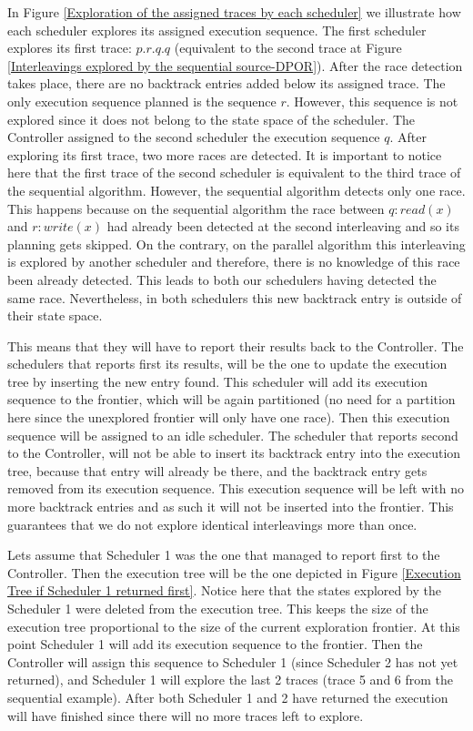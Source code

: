 
In Figure \ref{Exploration of the assigned traces by each scheduler} we illustrate how each scheduler explores its assigned 
execution sequence. The first scheduler explores its first trace: $p.r.q.q$ (equivalent to the second trace 
at Figure \ref{Interleavings explored by the sequential source-DPOR}). After the race detection takes place,
there are no backtrack entries added below its assigned trace. The only execution sequence planned is the sequence $r$. However,
this sequence is not explored since it does not belong to the state space of the scheduler. The Controller assigned to the
second scheduler the execution sequence $q$. After exploring its first trace, two more races are detected. It is important to notice
here that the first trace of the second scheduler is equivalent to the third trace of the sequential algorithm. However,
the sequential algorithm detects only one race. This happens because on the sequential algorithm the race between $q: read(x)$ and
$r:write(x)$ had already been detected at the second interleaving and so its planning gets skipped. 
On the contrary, on the parallel algorithm this interleaving
is explored by another scheduler and therefore, there is no knowledge of this race been already detected. This leads to
both our schedulers having detected the same race. Nevertheless, in both schedulers this new backtrack entry is outside of their
state space. 

This means that they will have to report their results back to the Controller. The schedulers that reports first its results, 
will be the one to update the execution tree by inserting the new entry found. This
scheduler will add its execution sequence to the frontier, which will be again partitioned
(no need for a partition here since the unexplored frontier will only have one race). Then this execution sequence will be
assigned to an idle scheduler. The scheduler that reports second to the Controller, will not be able to insert its 
backtrack entry into the execution tree, because that entry will already be there, and the backtrack entry gets removed
from its execution sequence. This execution sequence will be left with no more backtrack entries and as such it will not be
inserted into the frontier. This guarantees that we do not explore identical interleavings more than once.

Lets assume that Scheduler 1 was the one that managed to report first to the Controller. Then the execution tree will be the one
depicted in Figure \ref{Execution Tree if Scheduler 1 returned first}. Notice here that the states explored by the Scheduler 1
were deleted from the execution tree. This keeps the size of the execution tree proportional to the size of 
the current exploration frontier. At this point Scheduler 1 will add its execution sequence to the frontier. Then the 
Controller will assign this sequence to Scheduler 1 (since Scheduler 2 has not yet returned), and Scheduler 1 will explore
the last 2 traces (trace 5 and 6 from the sequential example). After both Scheduler 1 and 2 have returned the execution 
will have finished since there will no more traces left to explore.


